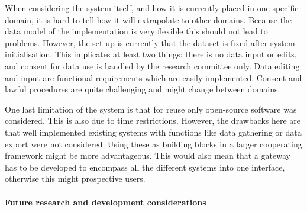 When considering the system itself, and how it is currently placed in one specific domain, it is hard to tell how it will extrapolate to other domains.
Because the data model of the implementation is very flexible this should not lead to problems.
However, the set-up is currently that the dataset is fixed after system initialisation.
This implicates at least two things: there is no data input or edits, and consent for data use is handled by the research committee only.
Data editing and input are functional requirements which are easily implemented.
Consent and lawful procedures are quite  challenging and might change between domains.

One last limitation of the system is that for reuse only open-source software was considered.
This is also due to time restrictions.
However, the drawbacks here are that well implemented existing systems with functions like data gathering or data export were not considered.
Using these as building blocks in a larger cooperating framework might be more advantageous.
This would also mean that a gateway has to be developed to encompass all the different systems into one interface, otherwise this might  prospective users.

\paragraph{Future research and development considerations}

%
%


